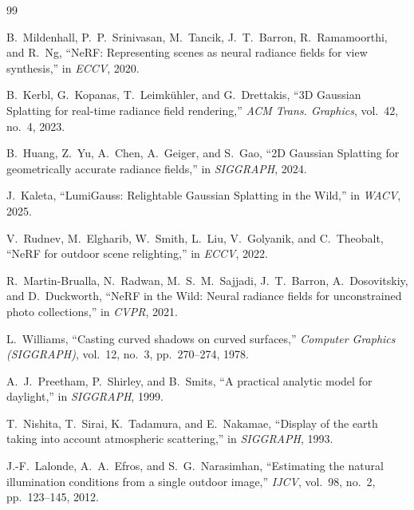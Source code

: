 \documentclass[conference]{IEEEtran}
\begin{document}
{\small
    
    \begin{thebibliography}{99}

        B.~Mildenhall, P.~P.~Srinivasan, M.~Tancik, J.~T.~Barron, R.~Ramamoorthi, and R.~Ng,
        ``NeRF: Representing scenes as neural radiance fields for view synthesis,''
        in \emph{ECCV}, 2020.

        B.~Kerbl, G.~Kopanas, T.~Leimk{\"u}hler, and G.~Drettakis,
        ``3D Gaussian Splatting for real-time radiance field rendering,''
        \emph{ACM Trans. Graphics}, vol.~42, no.~4, 2023.

        B.~Huang, Z.~Yu, A.~Chen, A.~Geiger, and S.~Gao,
        ``2D Gaussian Splatting for geometrically accurate radiance fields,''
        in \emph{SIGGRAPH}, 2024.

        J.~Kaleta,
        ``LumiGauss: Relightable Gaussian Splatting in the Wild,''
        in \emph{WACV}, 2025.

        V.~Rudnev, M.~Elgharib, W.~Smith, L.~Liu, V.~Golyanik, and C.~Theobalt,
        ``NeRF for outdoor scene relighting,''
        in \emph{ECCV}, 2022.

        R.~Martin-Brualla, N.~Radwan, M.~S.~M.~Sajjadi, J.~T.~Barron, A.~Dosovitskiy, and D.~Duckworth,
        ``NeRF in the Wild: Neural radiance fields for unconstrained photo collections,''
        in \emph{CVPR}, 2021.

        L.~Williams,
        ``Casting curved shadows on curved surfaces,''
        \emph{Computer Graphics (SIGGRAPH)}, vol.~12, no.~3, pp.~270--274, 1978.

        A.~J.~Preetham, P.~Shirley, and B.~Smits,
        ``A practical analytic model for daylight,''
        in \emph{SIGGRAPH}, 1999.

        T.~Nishita, T.~Sirai, K.~Tadamura, and E.~Nakamae,
        ``Display of the earth taking into account atmospheric scattering,''
        in \emph{SIGGRAPH}, 1993.

        J.-F.~Lalonde, A.~A.~Efros, and S.~G.~Narasimhan,
        ``Estimating the natural illumination conditions from a single outdoor image,''
        \emph{IJCV}, vol.~98, no.~2, pp.~123--145, 2012.


\end{thebibliography}}
\end{document}
